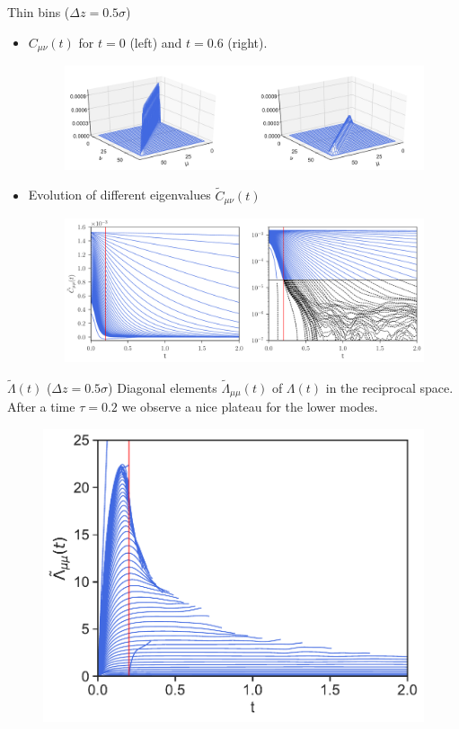\documentclass{beamer}
\begin{document}
\begin{frame}{Thin bins ($\Delta z=0.5\sigma$)}
  \begin{itemize}
    \item $C_{\mu\nu}(t)$ for  $t=0$ (left) and $t=0.6$ (right).
\begin{figure}[h!]
\includegraphics[width=\linewidth]{Ct-matrix-WALLS-66nodes}
\end{figure}
\item Evolution of different eigenvalues $\tilde{C}_{\mu\nu}(t)$
\begin{figure}[h!]
  \includegraphics[width=\linewidth]{CtRec-WALLS-66nodes-exp}
\end{figure}
\end{itemize}
\end{frame}

\begin{frame}{$\tilde{\Lambda}(t)$ ($\Delta z=0.5\sigma$)}
Diagonal elements  $\tilde{\Lambda}_{\mu\mu}(t)$ of $\Lambda(t)$ in the reciprocal space. After a time $\tau=0.2$ we observe a nice plateau for the lower modes. 
\begin{figure}[h!]
\includegraphics[scale=0.5]{LambdatRec-WALLS-66nodes}
\end{figure}
\end{frame}
\end{document}
